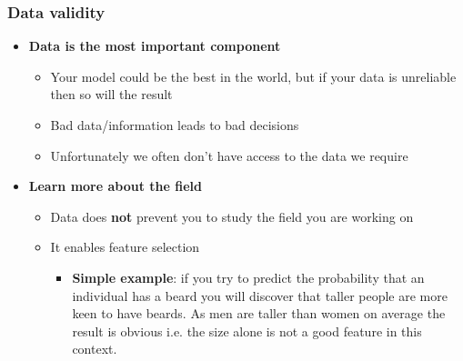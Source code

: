 \documentclass{beamer}
\begin{document}
\begin{frame}\frametitle{Data validity}
\begin{itemize}
	\setlength\itemsep{1em}
	\item {\bf Data is the most important component}
	\begin{itemize}
		\item Your model could be the best in the world, but if your data is unreliable then so will the result
		\item Bad data/information leads to bad decisions
		\item Unfortunately we often don't have access to the data we require
	\end{itemize}
	\item {\bf Learn more about the field}
	\begin{itemize}
		\item Data does {\bf not} prevent you to study the field you are working on
		\item It enables feature selection
		\begin{itemize}
			\item[] {\bf Simple example}: if you try to predict the probability that an individual has a beard you will discover that taller people are more keen to have beards. As men are taller than women on average the result is obvious i.e. the size alone is not a good feature in this context.
		\end{itemize}
	\end{itemize}
\end{itemize}
\end{frame}
\end{document}
